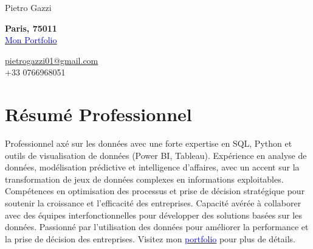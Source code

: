\documentclass[letterpaper,10.5pt]{article}
\begin{document}

\begin{center}
    {\LARGE Pietro Gazzi}\\
        \begin{multicols}{2}
        \begin{flushleft}
            \textbf{Paris, 75011}\\
            \href{https://pietrowei.github.io/Portfolio}{\underline{\textcolor{blue}{Mon Portfolio}}}
        \end{flushleft}
        \begin{flushright}
            \href{mailto:pietrogazzi01@gmail.com}{pietrogazzi01@gmail.com}\\
            +33 0766968051
        \end{flushright}
    \end{multicols}
\end{center}

\section*{Résumé Professionnel}
Professionnel axé sur les données avec une forte expertise en SQL, Python et outils de visualisation de données (Power BI, Tableau). Expérience en analyse de données, modélisation prédictive et intelligence d'affaires, avec un accent sur la transformation de jeux de données complexes en informations exploitables. Compétences en optimisation des processus et prise de décision stratégique pour soutenir la croissance et l'efficacité des entreprises. Capacité avérée à collaborer avec des équipes interfonctionnelles pour développer des solutions basées sur les données. Passionné par l'utilisation des données pour améliorer la performance et la prise de décision des entreprises. Visitez mon \href{https://pietrowei.github.io/Portfolio}{\underline{\textcolor{blue}{portfolio}}} pour plus de détails.

\end{document}
